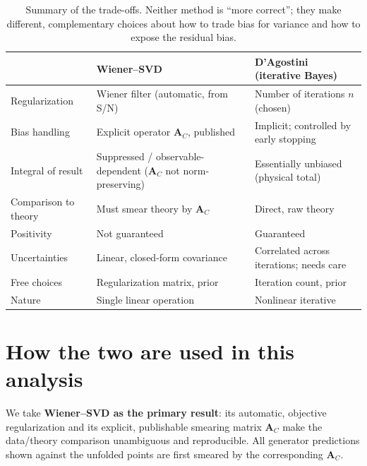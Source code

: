 \documentclass[11pt]{article}
\newcommand{\AC}{\mathbf{A}_C}
\begin{document}
\begin{table}[h]
  \centering
  \begin{tabular}{p{4.3cm}p{5.0cm}p{5.0cm}}
    \toprule
     & \textbf{Wiener--SVD} & \textbf{D'Agostini (iterative Bayes)} \\
    \midrule
    Regularization & Wiener filter (automatic, from S/N) & Number of iterations $n$ (chosen) \\
    Bias handling & Explicit operator $\AC$, published & Implicit; controlled by early stopping \\
    Integral of result & Suppressed / observable-dependent ($\AC$ not norm-preserving) & Essentially unbiased (physical total) \\
    Comparison to theory & Must smear theory by $\AC$ & Direct, raw theory \\
    Positivity & Not guaranteed & Guaranteed \\
    Uncertainties & Linear, closed-form covariance & Correlated across iterations; needs care \\
    Free choices & Regularization matrix, prior & Iteration count, prior \\
    Nature & Single linear operation & Nonlinear iterative \\
    \bottomrule
  \end{tabular}
  \caption{Summary of the trade-offs. Neither method is ``more correct''; they make
  different, complementary choices about how to trade bias for variance and how to expose
  the residual bias.}
  \label{tab:compare}
\end{table}

\section{How the two are used in this analysis}

We take \textbf{Wiener--SVD as the primary result}: its automatic, objective
regularization and its explicit, publishable smearing matrix $\AC$ make the data/theory
comparison unambiguous and reproducible. All generator predictions shown against the
unfolded points are first smeared by the corresponding $\AC$.
\end{document}
